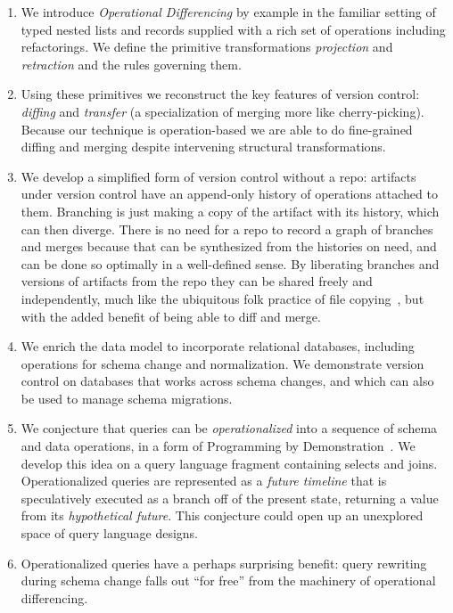 \documentclass[english,submission]{programming}
\theoremstyle{definition}
\begin{document}
\begin{enumerate}

\item We introduce \textit{Operational Differencing} by example in the familiar setting of typed nested lists and records supplied with a rich set of operations
including refactorings. We define the primitive transformations \textit{projection} and \textit{retraction} and the rules governing them.

\item Using these primitives we reconstruct the key features of version control: \textit{diffing} and \textit{transfer} (a specialization of merging more like cherry-picking). Because our technique is operation-based we are able to do fine-grained diffing and merging despite intervening structural transformations.

\item We develop a simplified form of version control without a repo: artifacts under version control have an append-only history of operations attached to them. Branching is just making a copy of the artifact with its history, which can then diverge. There is no need for a repo to record a graph of branches and merges because that can be synthesized from the histories on need, and can be done so optimally in a well-defined sense. By liberating branches and versions of artifacts from the repo they can be shared freely and independently, much like the ubiquitous folk practice of file copying~\cite{Burnett14, Basman19}, but with the added benefit of being able to diff and merge.

\item We enrich the data model to incorporate relational databases, including operations for schema change and normalization. We demonstrate version control on databases that works across schema changes, and which can also be used to manage schema migrations.

\item We conjecture that queries can be \textit{operationalized} into a sequence of schema and data operations, in a form of Programming by Demonstration~\cite{cypher93-pbd}. We develop this idea on a query language fragment containing selects and joins. Operationalized queries are represented as a \textit{future timeline} that is speculatively executed as a branch off of the present state, returning a value from its \textit{hypothetical future}. This conjecture could open up an unexplored space of query language designs.

\item Operationalized queries have a perhaps surprising benefit: query rewriting~\cite{curino08, herrmann17} during schema change falls out ``for free'' from the machinery of operational differencing.


\end{enumerate}
\end{document}
